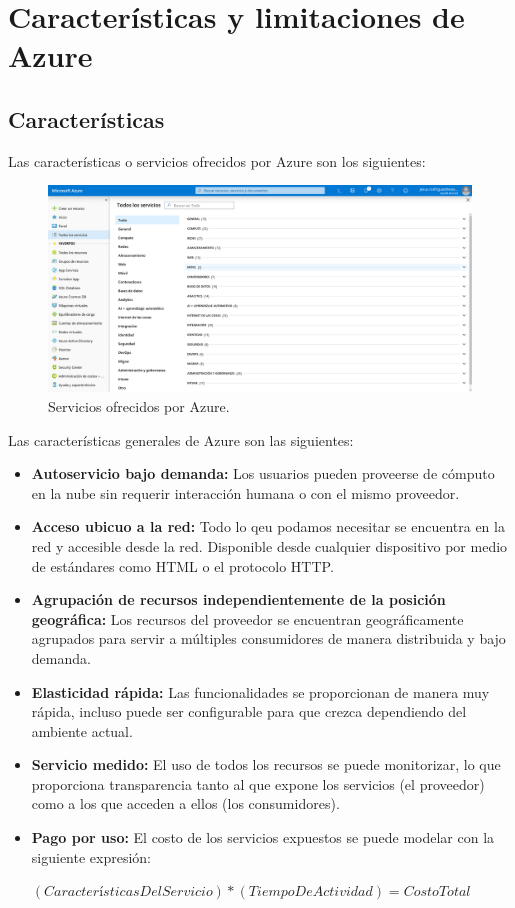 \chapter{Características y limitaciones de Azure}
\section{Características}
Las características o servicios ofrecidos por Azure son los siguientes:
\begin{figure}[h]
	\centering
	\includegraphics[scale=0.26]{ImagenesAzure/Servicios.png}
	\caption{Servicios ofrecidos por Azure.}
	\label{Servicios ofrecidos por Azure}
\end{figure}

Las características generales de Azure son las siguientes:
\begin{itemize}
	\item \textbf{Autoservicio bajo demanda:} Los usuarios pueden proveerse de cómputo en la nube sin requerir interacción humana o con el mismo proveedor.
	\item \textbf{Acceso ubicuo a la red:} Todo lo qeu podamos necesitar se encuentra en la red y accesible desde la red. Disponible desde cualquier dispositivo por medio de estándares como HTML o el protocolo HTTP.
	\item \textbf{Agrupación de recursos independientemente de la posición geográfica:} Los recursos del proveedor se encuentran geográficamente agrupados para servir a múltiples consumidores de manera distribuida y bajo demanda.
	\item \textbf{Elasticidad rápida:} Las funcionalidades se proporcionan de manera muy rápida, incluso puede ser configurable para que crezca dependiendo del ambiente actual.
	\item \textbf{Servicio medido:} El uso de todos los recursos se puede monitorizar, lo que proporciona transparencia tanto al que expone los servicios (el proveedor) como a los que acceden a ellos (los consumidores).
	\item \textbf{Pago por uso:} El costo de los servicios expuestos se puede modelar con la siguiente expresión:
	\begin{center}
		$(CaracterísticasDelServicio) * (TiempoDeActividad) = CostoTotal$
	\end{center}
\end{itemize}

